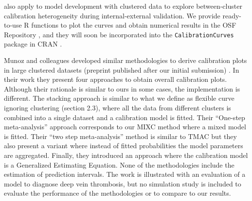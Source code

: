 also apply to model development with clustered data to explore between-cluster calibration heterogeneity during internal-external validation. We provide ready-to-use R functions to plot the curves and obtain numerical results in the \gls{OSF} Repository \cite{barrenadaOSFClusteredFlexible2024}, and they will soon be incorporated into the \texttt{CalibrationCurves} package in CRAN \cite{DeCock2023}.

Munoz and colleagues developed similar methodologies to derive calibration plots in large clustered datasets (preprint published after our initial submission) \cite{munoz2025}. In their work they present four approaches to obtain overall calibration plots. Although their rationale is similar to ours in some cases, the implementation is different. The stacking approach is similar to what we define as flexible curve ignoring clustering (section 2.3), where all the data from different clusters is combined into a single dataset and a calibration model is fitted. Their ``One-step meta-analysis'' approach corresponds to our \gls{MIXC} method where a mixed model is fitted. Their ``two step meta-analysis'' method is similar to \gls{TMAC} but they also present a variant where instead of fitted probabilities the model parameters are aggregated. Finally, they introduced an approach where the calibration model is a Generalized Estimating Equation. None of the methodologies include the estimation of prediction intervals. The work is illustrated with an evaluation of a model to diagnose deep vein thrombosis, but no simulation study is included to evaluate the performance of the methodologies or to compare to our results.

